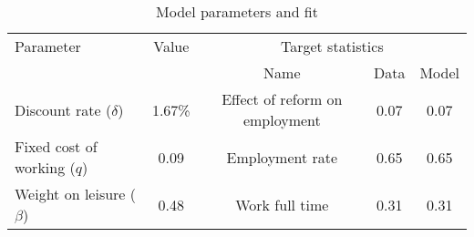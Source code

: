 \begin{table}[htbp]\caption{Model parameters and fit}\label{table:model_param}\centering\footnotesize\begin{tabular}{lcccc} \toprule  Parameter & Value & \multicolumn{3}{c}{Target statistics}  \\\cline{3-5}  &  &  Name & Data & Model  \\\midrule    Discount rate ($\delta$)      &1.67\%& Effect of reform on employment   & 0.07 &0.07\\ Fixed cost of working ($q$)   &0.09& Employment rate                  & 0.65 &0.65\\ Weight on leisure ($\beta$)   &0.48& Work full time             & 0.31 &0.31\\  \bottomrule\end{tabular}\end{table}
